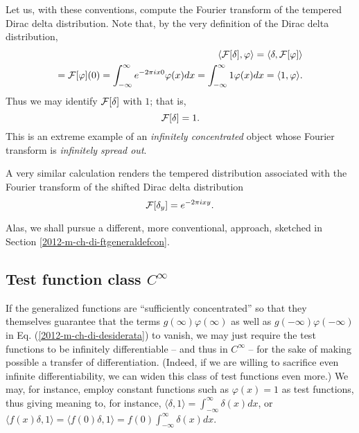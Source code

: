 {
\color{blue}
\bexample
Let us, with these conventions, compute the Fourier transform of the tempered Dirac delta distribution.
Note that, by the very definition of the  Dirac delta distribution,
\begin{equation}
\begin{split}
\langle    {\cal F}[\delta  ] , \varphi \rangle
=
\langle   \delta , {\cal F}[\varphi ]\rangle
\\ =
{\cal F}[\varphi](0)=  \int_{-\infty}^\infty  e^{- 2\pi ix 0} \varphi (x) dx
=  \int_{-\infty}^\infty  1 \varphi (x) dx
=  \langle   1 , \varphi \rangle
.
\end{split}
\end{equation}
Thus we may identify  ${\cal F}[\delta  ]$ with $1$; that is,
\begin{equation}
{\cal F}[\delta  ] = 1
.
\end{equation}
This is an extreme example of an {\em infinitely concentrated} object whose Fourier transform is
{\em infinitely spread out}.

A very similar calculation renders the tempered distribution associated with the Fourier transform of the shifted Dirac delta distribution
\begin{equation}
{\cal F}[\delta_y  ] = e^{- 2\pi ix y}
.
\end{equation}
\eexample
}

Alas, we shall pursue a different, more conventional, approach, sketched in Section \ref{2012-m-ch-di-ftgeneraldefcon}.

\subsection{Test function class $C^\infty$}

If the generalized functions are ``sufficiently concentrated'' so that they themselves guarantee that the terms
$g(\infty)\varphi(\infty)$ as well as $g(-\infty)\varphi(-\infty)$
in Eq. (\ref{2012-m-ch-di-desiderata}) to vanish,
we may just require the test functions to be infinitely differentiable -- and thus in $C^\infty$ --
for the sake of making possible a transfer of differentiation.
(Indeed, if we are willing to sacrifice even infinite differentiability, we can widen this class of test functions even more.)
We may, for instance, employ constant functions such as $\varphi (x)=1$ as test functions,
thus giving meaning to, for instance,
$\langle \delta , 1\rangle= \int_{-\infty}^\infty \delta (x) dx$,
or
$\langle f(x)\delta , 1\rangle= \langle f(0)\delta , 1\rangle= f(0)\int_{-\infty}^\infty  \delta (x) dx$.

